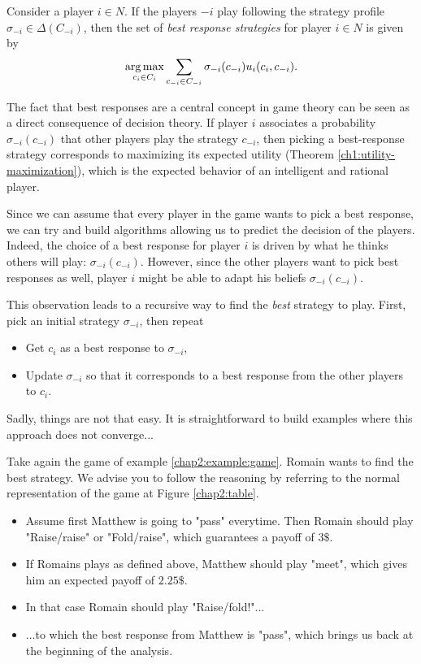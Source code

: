 \begin{definition}
Consider a player $i \in N$. If the players $-i$ play following the strategy profile $\sigma_{-i} \in \Delta(C_{-i})$, then the set of \emph{best response strategies} for player $i \in N$ is given by 
$$ \operatorname*{arg\,max}_{c_i \in C_i} \sum_{c_{-i} \in C_{-i}} \sigma_{-i}(c_{-i}) u_i(c_i, c_{-i}).$$
\end{definition} 

The fact that best responses are a central concept in game theory can be seen as a direct consequence of decision theory. If player $i$ associates a probability $\sigma_{-i}(c_{-i}) $ that other players play the strategy $c_{-i}$, then picking a best-response strategy corresponds to maximizing its expected utility (Theorem \ref{ch1:utility-maximization}), which is the expected behavior of an intelligent and rational player. 

Since we can assume that every player in the game wants to pick a best response, we can try and build algorithms allowing us to predict the decision of the players. 
Indeed, the choice of a best response for player $i$ is driven by what he thinks others will play: $\sigma_{-i}(c_{-i}) $. However, since the other players want to pick best responses as well, player $i$ might be able to adapt his beliefs $\sigma_{-i}(c_{-i}) $.

This observation leads to a recursive way to  find the \emph{best} strategy to play. First, pick an initial strategy $\sigma_{-i}$,  then repeat
\begin{itemize}
 \item Get $c_i$ as a best response to $\sigma_{-i}$, 
 \item Update $\sigma_{-i}$ so that it corresponds to a best response from the other players to $c_i$.
\end{itemize}

Sadly, things are not that easy. It is straightforward to build examples where this approach does not converge...

\begin{example}
Take again the game of example \ref{chap2:example:game}. Romain wants to find the best strategy. We advise you to follow the reasoning by referring to the normal representation of the game at Figure \ref{chap2:table}.

\begin{itemize}
\item Assume first Matthew is going to "pass" everytime. Then Romain should play "Raise/raise" or "Fold/raise", which guarantees a payoff of $3\$$.
\item If Romains plays as defined above, Matthew should play "meet", which gives him an expected payoff of $2.25\$$.
\item In that case Romain should play "Raise/fold!"...
\item ...to which the best response from Matthew is "pass", which brings us back at the beginning of the analysis.
\end{itemize}

\label{chap2:example:bestresponseequilibria}
\end{example}

